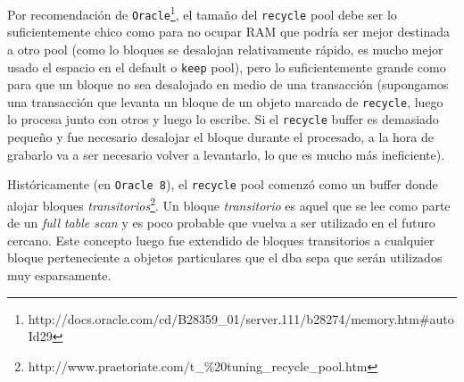 Por recomendación de \texttt{Oracle}\footnote{http://docs.oracle.com/cd/B28359\_01/server.111/b28274/memory.htm\#autoId29}, el tamaño del \texttt{recycle} pool debe ser lo suficientemente chico como para no ocupar RAM que podría ser mejor destinada a otro pool (como lo bloques se desalojan relativamente rápido, es mucho mejor usado el espacio en el default o \texttt{keep} pool), pero lo suficientemente grande como para que un bloque no sea desalojado en medio de una transacción (supongamos una transacción que levanta un bloque de un objeto marcado de \texttt{recycle}, luego lo procesa junto con otros y luego lo escribe. Si el \texttt{recycle} buffer es demasiado pequeño y fue necesario desalojar el bloque durante el procesado, a la hora de grabarlo va a ser necesario volver a levantarlo, lo que es mucho más ineficiente).

Históricamente (en \texttt{Oracle 8}), el \texttt{recycle} pool comenzó como un buffer donde alojar bloques \textit{transitorios}\footnote{http://www.praetoriate.com/t\_\%20tuning\_recycle\_pool.htm}. Un bloque \textit{transitorio} es aquel que se lee como parte de un \textit{full table scan} y es poco probable que vuelva a ser utilizado en el futuro cercano. Este concepto luego fue extendido de bloques transitorios a cualquier bloque perteneciente a objetos particulares que el dba sepa que serán utilizados muy esparsamente.
